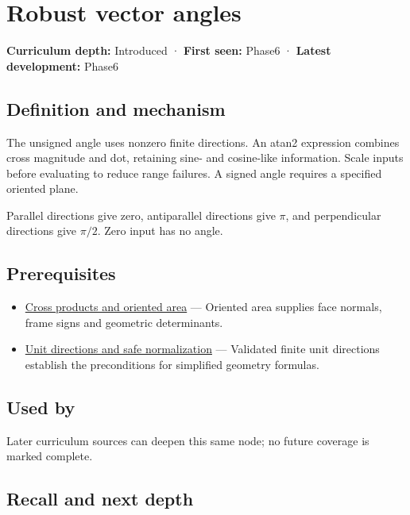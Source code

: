 \hypertarget{appendix-e569e60e18e6}{}
\section{Robust vector angles}\label{appendix-e569e60e18e6-robust-vector-angles}

\textbf{Curriculum depth:} Introduced · \textbf{First seen:} Phase6 · \textbf{Latest development:} Phase6

\subsection{Definition and mechanism}\label{appendix-e569e60e18e6-definition-and-mechanism}

The unsigned angle uses nonzero finite directions. An atan2 expression combines cross magnitude and dot, retaining sine- and cosine-like information. Scale inputs before evaluating to reduce range failures. A signed angle requires a specified oriented plane.

Parallel directions give zero, antiparallel directions give \(\pi\), and perpendicular directions give \(\pi/2\). Zero input has no angle.

\subsection{Prerequisites}\label{appendix-e569e60e18e6-prerequisites}

\begin{itemize}
\tightlist
\item
  \hyperref[appendix-2391db8052b1]{Cross products and oriented area} --- Oriented area supplies face normals, frame signs and geometric determinants.
\item
  \hyperref[appendix-f744e41b95b4]{Unit directions and safe normalization} --- Validated finite unit directions establish the preconditions for simplified geometry formulas.
\end{itemize}

\subsection{Used by}\label{appendix-e569e60e18e6-used-by}

Later curriculum sources can deepen this same node; no future coverage is marked complete.

\subsection{Recall and next depth}\label{appendix-e569e60e18e6-recall-and-next-depth}


